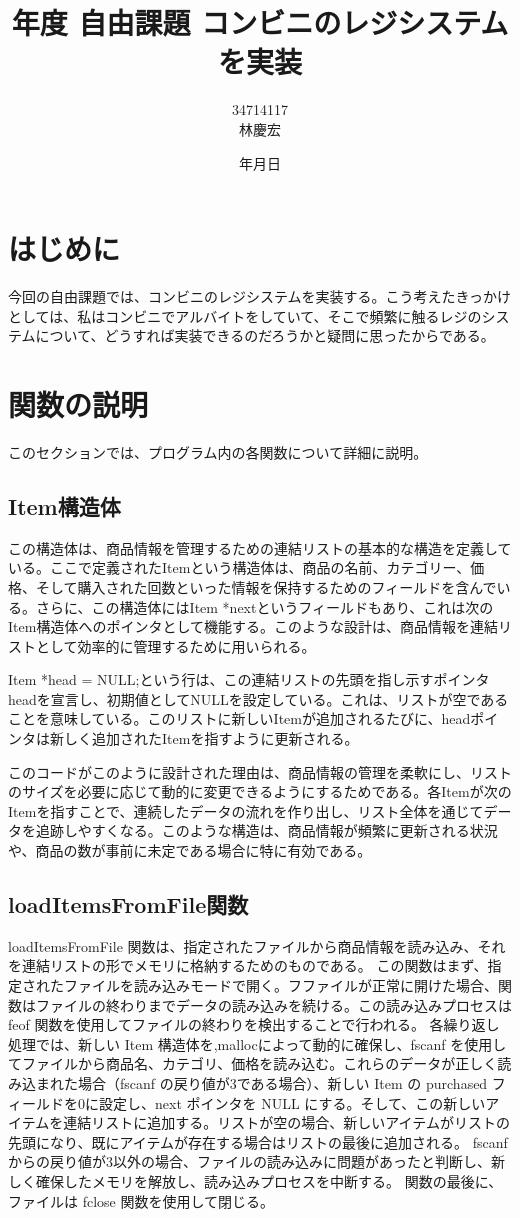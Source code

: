 \documentclass[a4j,11pt]{jarticle}
\title{{\thisyear}年度 自由課題 コンビニのレジシステムを実装}
\date{\the\year 年\the\month 月\the\day 日}
\author{34714117 \\ 林慶宏}
\begin{document}
\maketitle
\clearpage

\section{はじめに}
今回の自由課題では、コンビニのレジシステムを実装する。こう考えたきっかけとしては、私はコンビニでアルバイトをしていて、そこで頻繁に触るレジのシステムについて、どうすれば実装できるのだろうかと疑問に思ったからである。

\section{関数の説明}
このセクションでは、プログラム内の各関数について詳細に説明。
\subsection{Item構造体}
この構造体は、商品情報を管理するための連結リストの基本的な構造を定義している。ここで定義されたItemという構造体は、商品の名前、カテゴリー、価格、そして購入された回数といった情報を保持するためのフィールドを含んでいる。さらに、この構造体にはItem *nextというフィールドもあり、これは次のItem構造体へのポインタとして機能する。このような設計は、商品情報を連結リストとして効率的に管理するために用いられる。

Item *head = NULL;という行は、この連結リストの先頭を指し示すポインタheadを宣言し、初期値としてNULLを設定している。これは、リストが空であることを意味している。このリストに新しいItemが追加されるたびに、headポインタは新しく追加されたItemを指すように更新される。

このコードがこのように設計された理由は、商品情報の管理を柔軟にし、リストのサイズを必要に応じて動的に変更できるようにするためである。各Itemが次のItemを指すことで、連続したデータの流れを作り出し、リスト全体を通じてデータを追跡しやすくなる。このような構造は、商品情報が頻繁に更新される状況や、商品の数が事前に未定である場合に特に有効である。
\subsection{loadItemsFromFile関数}
loadItemsFromFile 関数は、指定されたファイルから商品情報を読み込み、それを連結リストの形でメモリに格納するためのものである。
この関数はまず、指定されたファイルを読み込みモードで開く。フファイルが正常に開けた場合、関数はファイルの終わりまでデータの読み込みを続ける。この読み込みプロセスは feof 関数を使用してファイルの終わりを検出することで行われる。
各繰り返し処理では、新しい Item 構造体を,mallocによって動的に確保し、fscanf を使用してファイルから商品名、カテゴリ、価格を読み込む。これらのデータが正しく読み込まれた場合（fscanf の戻り値が3である場合）、新しい Item の purchased フィールドを0に設定し、next ポインタを NULL にする。そして、この新しいアイテムを連結リストに追加する。リストが空の場合、新しいアイテムがリストの先頭になり、既にアイテムが存在する場合はリストの最後に追加される。
fscanf からの戻り値が3以外の場合、ファイルの読み込みに問題があったと判断し、新しく確保したメモリを解放し、読み込みプロセスを中断する。
関数の最後に、ファイルは fclose 関数を使用して閉じる。
\end{document}
